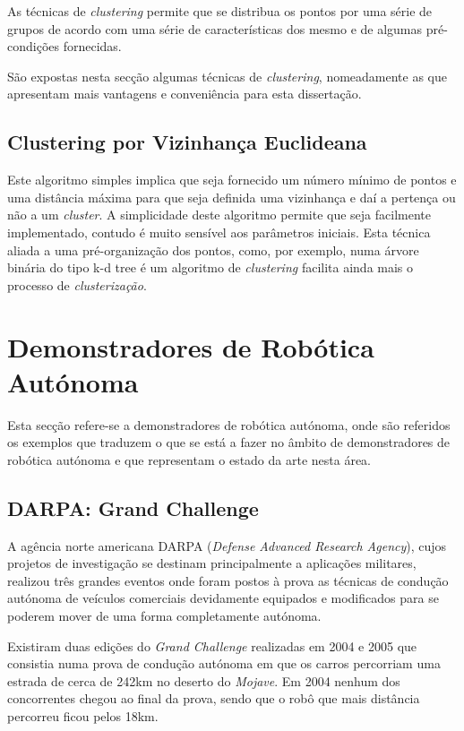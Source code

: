 As técnicas de \emph{clustering} permite que se distribua os pontos por uma série de grupos de acordo com uma série de características dos mesmo e de algumas pré-condições fornecidas.

São expostas nesta secção algumas técnicas de \emph{clustering}, nomeadamente as que apresentam mais vantagens e conveniência para esta dissertação.

\subsection{Clustering por Vizinhança Euclideana}

Este algoritmo simples implica que seja fornecido um número mínimo de pontos e uma distância máxima para que seja definida uma vizinhança e daí a pertença ou não a um \emph{cluster}. A simplicidade deste algoritmo permite que seja facilmente implementado, contudo é muito sensível aos parâmetros iniciais.
Esta técnica aliada a uma pré-organização dos pontos, como, por exemplo, numa árvore binária do tipo k-d tree\cite{Bentley:1975:MBS:361002.361007} é um algoritmo de \emph{clustering} facilita ainda mais o processo de \emph{clusterização}.


\section{Demonstradores de Robótica Autónoma}
Esta secção refere-se a demonstradores de robótica autónoma, onde são referidos
os exemplos que traduzem o que se está a fazer no âmbito de demonstradores de
robótica autónoma e que representam o estado da arte nesta área.


\subsection{DARPA: Grand Challenge}
A agência norte americana DARPA (\emph{Defense Advanced Research Agency}), cujos projetos de investigação se destinam principalmente a aplicações militares, realizou três grandes eventos onde foram postos à prova as técnicas de condução autónoma de veículos comerciais devidamente equipados e modificados para se poderem mover de uma forma completamente autónoma.  

Existiram duas edições do \emph{Grand Challenge} realizadas em 2004 e 2005 que consistia numa prova de condução autónoma em que os carros percorriam uma estrada de cerca de 242km no deserto do \emph{Mojave}. Em 2004 nenhum dos concorrentes chegou ao final da prova, sendo que o robô que mais distância percorreu ficou pelos 18km.

